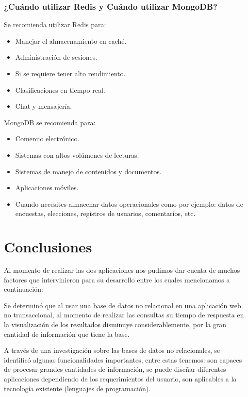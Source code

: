 \documentclass[twoside,twocolumn]{article}
\begin{document}
\subsubsection{¿Cuándo utilizar Redis y Cuándo utilizar MongoDB?}
Se recomienda utilizar Redis para:
\begin{itemize}
    \item 	Manejar el almacenamiento en caché.
    \item	Administración de sesiones.
    \item	Si se requiere tener alto rendimiento.
    \item	Clasificaciones en tiempo real.
    \item	Chat y mensajería.
    
\end{itemize}
MongoDB se recomienda para:
\begin{itemize}
    \item 	Comercio electrónico.
    \item	Sistemas con altos volúmenes de lecturas.
    \item	Sistemas de manejo de contenidos y documentos.
    \item	Aplicaciones móviles.
    \item	Cuando necesites almacenar datos operacionales como por ejemplo: datos de encuestas, elecciones, registros de usuarios, comentarios, etc.
      
\end{itemize}
\section{Conclusiones}
Al momento de realizar las dos aplicaciones nos pudimos dar cuenta de muchos factores que intervinieron para su desarrollo entre los cuales mencionamos a continuación: 

Se determinó que al usar una base de datos no relacional en una aplicación web no transaccional, al momento de realizar las consultas su tiempo de respuesta en la visualización de los resultados disminuye considerablemente, por la gran cantidad de información que tiene la base. 

 
A través de una investigación sobre las bases de datos no relacionales, se identificó algunas funcionalidades importantes, entre estas tenemos: son capaces de procesar grandes cantidades de información, se puede diseñar diferentes aplicaciones dependiendo de los requerimientos del usuario, son aplicables a la tecnología existente (lenguajes de programación). 
\end{document}
